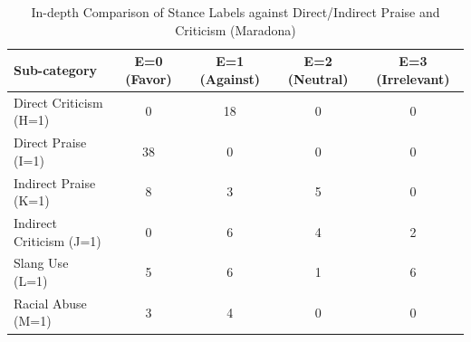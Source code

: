 \documentclass{article}
\begin{document}
\begin{table}[htbp] %
    \centering %
    \caption{In-depth Comparison of Stance Labels against Direct/Indirect Praise and Criticism (Maradona) } %
    \label{tab:statistical_summary} %
    \renewcommand{\arraystretch}{1.2} %
    \begin{adjustbox}{max width=\linewidth} %
        \begin{tabular}{l c c c c} %
            \toprule %
            \textbf{Sub-category} & \textbf{E=0 (Favor)} & \textbf{E=1 (Against)} & \textbf{E=2 (Neutral)} & \textbf{E=3 (Irrelevant)} \\ %
            \midrule %
            Direct Criticism (H=1)  & 0  & 18 & 0  & 0 \\
            Direct Praise (I=1)     & 38 & 0  & 0  & 0 \\
            Indirect Praise (K=1)   & 8  & 3  & 5  & 0 \\
            Indirect Criticism (J=1) & 0  & 6  & 4  & 2 \\
            Slang Use (L=1)         & 5  & 6  & 1  & 6 \\
            Racial Abuse (M=1)      & 3  & 4  & 0  & 0 \\
            \bottomrule %
        \end{tabular}
    \end{adjustbox}
\end{table}

\FloatBarrier %
\end{document}
